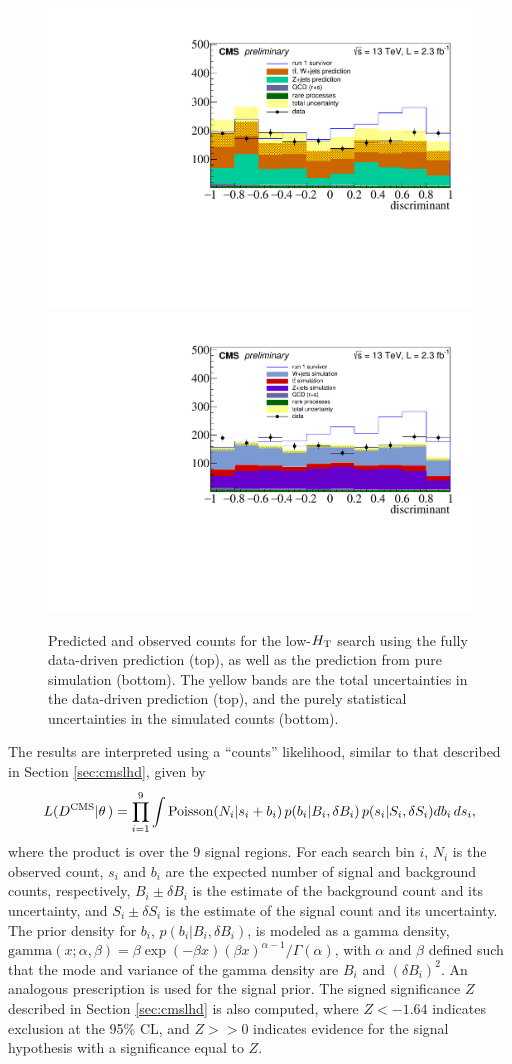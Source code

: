 \begin{figure}[tb!]
\centering
\includegraphics[width=0.65\linewidth]{figures/SusySearches/MvaSusy/ResultDD.pdf}\\
\includegraphics[width=0.65\linewidth]{figures/SusySearches/MvaSusy/ResultMC.pdf}
\caption{Predicted and observed counts for the low-$H_{\rm T}$ search using the fully data-driven prediction (top), as well as the prediction from pure simulation (bottom). The yellow bands are the total uncertainties in the data-driven prediction (top), and the purely statistical uncertainties in the simulated counts (bottom).}
\label{fig:results}
\end{figure}

The results are interpreted using a ``counts'' likelihood, similar to that described in Section \ref{sec:cmslhd}, given by  
\begin{equation}
L(D^{\text{CMS}}|\theta\,) = \prod_{i=1}^9 \int \textrm{Poisson}(N_i | s_i+ b_i) \, p(b_i|B_i, \delta B_i) \, p(s_i|S_i, \delta S_i) db_i\, ds_i,
\label{eq:lhd_counts}
\end{equation}
where the product is over the 9 signal regions. For each search bin $i$, $N_i$ is the observed count,
$s_i$ and $b_i$ are the expected number of signal and background counts, respectively,
 $B_i \pm\delta B_i$ is the estimate of the background count and its uncertainty, and 
 $S_i \pm\delta S_i$ is the estimate of the signal count and its uncertainty.
The prior density for $b_i$, $p(b_i|B_i, \delta B_i)$, is modeled as a gamma density, 
$\textrm{gamma}(x;\alpha,\beta) = \beta \exp(-\beta x)  (\beta x)^{\alpha-1}/\Gamma(\alpha)$,
with $\alpha$ and $\beta$ defined such that the mode and variance of the gamma density are 
$B_i$ and $(\delta B_i)^2$. An analogous prescription is used for the signal prior. 
The signed significance $Z$ described in Section \ref{sec:cmslhd} is also computed, where $Z<-1.64$ indicates exclusion at the
95\% CL, and $Z>>0$ indicates evidence for the signal hypothesis with a significance equal to $Z$.

